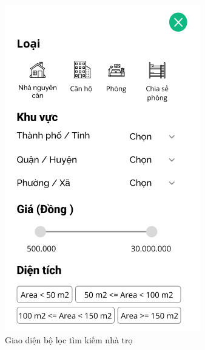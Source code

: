\begin{figure}[!htb]
\centering
   \begin{minipage}{0.32\textwidth}
     \centering
     \includegraphics[width=1\linewidth]{Images/UI figma/Frame 1.png}
     \caption{Giao diện bộ lọc tìm kiếm nhà trọ}
   \end{minipage}\hspace{1cm}
   \begin{minipage}{0.32\textwidth}
     \centering

\end{minipage}
\end{figure}
